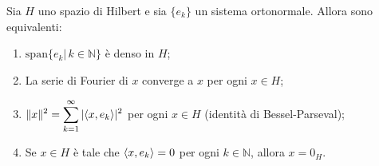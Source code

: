 \begin{theorem}\label{thm:conv_Fourier}
    Sia \(H\) uno spazio di Hilbert e sia \(\{e_{k}\} \) un sistema ortonormale.
    Allora sono equivalenti:
    
    \begin{enumerate}[label = \textit{\roman*)}]
    \item \(\mathrm{span} \{e_{k} | \, k \in \mathbb{N}\}\) è denso in \(H\);
    \item La serie di Fourier di \(x\) converge a \(x\) per ogni \(x \in H\);
    \item \(\displaystyle \|x\|^2 = \sum_{k=1}^{\infty} |{\left\langle x, e_{k}\right\rangle} |^2 \)
        per ogni \(x \in H\) (identità di Bessel-Parseval);
    \item Se \(x \in H\) è tale che \({\left\langle x, e_{k}\right\rangle} = 0\) per ogni \(k \in
        \mathbb{N}\), allora \(x = 0_H\).
\end{enumerate}
\end{theorem}

